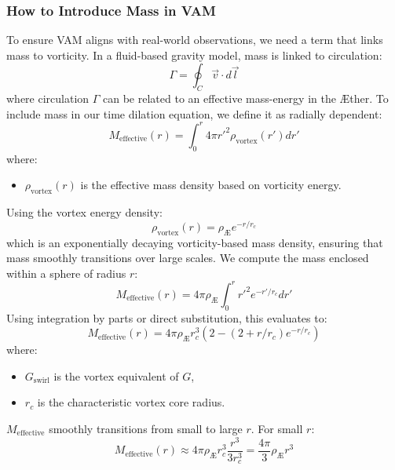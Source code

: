 \subsubsection*{How to Introduce Mass in VAM}
To ensure VAM aligns with real-world observations, we need a term that links mass to vorticity. In a fluid-based gravity model, mass is linked to circulation:
\begin{equation}
    \Gamma = \oint_C \vec{v} \cdot d\vec{l}
\end{equation}
where circulation $\Gamma$ can be related to an effective mass-energy in the \AE ther. To include mass in our time dilation equation, we define it as radially dependent:
\begin{equation}
    M_{\text{effective}}(r) = \int_0^r 4\pi r'^2 \rho_{\text{vortex}}(r') dr'
\end{equation}
where:
\begin{itemize}
    \item $\rho_{\text{vortex}}(r)$ is the effective mass density based on vorticity energy.
\end{itemize}
Using the vortex energy density:
\begin{equation}
    \rho_{\text{vortex}}(r) = \rho_{\text{\AE}} e^{-r / r_c}
\end{equation}
which is an exponentially decaying vorticity-based mass density, ensuring that mass smoothly transitions over large scales. We compute the mass enclosed within a sphere of radius $r$:
\begin{equation}
    M_{\text{effective}}(r) = 4\pi \rho_{\text{\AE}} \int_0^r r'^2 e^{-r' / r_c} dr'
\end{equation}
Using integration by parts or direct substitution, this evaluates to:
\begin{equation}
    M_{\text{effective}}(r) = 4\pi \rho_{\text{\AE}} r_c^3 \left( 2 - (2 + r/r_c) e^{-r / r_c} \right)
\end{equation}
where:
\begin{itemize}
    \item $G_{\text{swirl}}$ is the vortex equivalent of $G$,
    \item $r_c$ is the characteristic vortex core radius.
\end{itemize}
$M_{\text{effective}}$ smoothly transitions from small to large $r$. For small $r$:
\begin{equation}
    M_{\text{effective}}(r) \approx 4\pi \rho_{\text{\AE}} r_c^3 \frac{r^3}{3 r_c^3} = \frac{4\pi}{3} \rho_{\text{\AE}} r^3
\end{equation}
